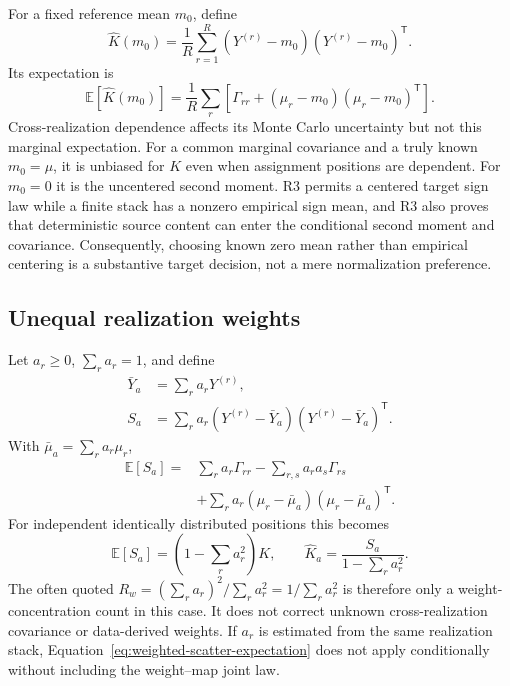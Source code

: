 \documentclass[11pt]{article}
\newcommand{\E}{\mathbb{E}}
\begin{document}
For a fixed reference mean $m_0$, define
\begin{equation}
  \widehat K(m_0)
  =\frac1R\sum_{r=1}^R
    (Y^{(r)}-m_0)(Y^{(r)}-m_0)^{\mathsf T}.
  \label{eq:known-mean-estimator}
\end{equation}
Its expectation is
\begin{equation}
  \E[\widehat K(m_0)]
  =\frac1R\sum_r\left[
    \Gamma_{rr}+(\mu_r-m_0)(\mu_r-m_0)^{\mathsf T}
  \right].
  \label{eq:known-mean-expectation}
\end{equation}
Cross-realization dependence affects its Monte Carlo uncertainty but not this
marginal expectation.  For a common marginal covariance and a truly known
$m_0=\mu$, it is unbiased for $K$ even when assignment positions are
dependent.  For $m_0=0$ it is the uncentered second moment.  R3 permits a
centered target sign law while a finite stack has a nonzero empirical sign
mean, and R3 also proves that deterministic source content can enter the
conditional second moment and covariance.  Consequently, choosing known zero
mean rather than empirical centering is a substantive target decision, not a
mere normalization preference.

\subsection{Unequal realization weights}

Let $a_r\ge0$, $\sum_ra_r=1$, and define
\begin{align}
  \bar Y_a &=\sum_ra_rY^{(r)},\\
  S_a &=\sum_ra_r(Y^{(r)}-\bar Y_a)
                    (Y^{(r)}-\bar Y_a)^{\mathsf T}.
  \label{eq:weighted-scatter}
\end{align}
With $\bar\mu_a=\sum_ra_r\mu_r$,
\begin{align}
  \E[S_a]={}&\sum_ra_r\Gamma_{rr}
  -\sum_{r,s}a_ra_s\Gamma_{rs}
  \nonumber\\
  &+\sum_ra_r(\mu_r-\bar\mu_a)(\mu_r-\bar\mu_a)^{\mathsf T}.
  \label{eq:weighted-scatter-expectation}
\end{align}
For independent identically distributed positions this becomes
\begin{equation}
  \E[S_a]=\left(1-\sum_ra_r^2\right)K,
  \qquad
  \widehat K_a=\frac{S_a}{1-\sum_ra_r^2}.
  \label{eq:weighted-iid-correction}
\end{equation}
The often quoted $R_w=(\sum_ra_r)^2/\sum_ra_r^2=1/\sum_ra_r^2$ is therefore
only a weight-concentration count in this case.  It does not correct unknown
cross-realization covariance or data-derived weights.  If $a_r$ is estimated
from the same realization stack, Equation~\eqref{eq:weighted-scatter-expectation}
does not apply conditionally without including the weight--map joint law.
\end{document}

